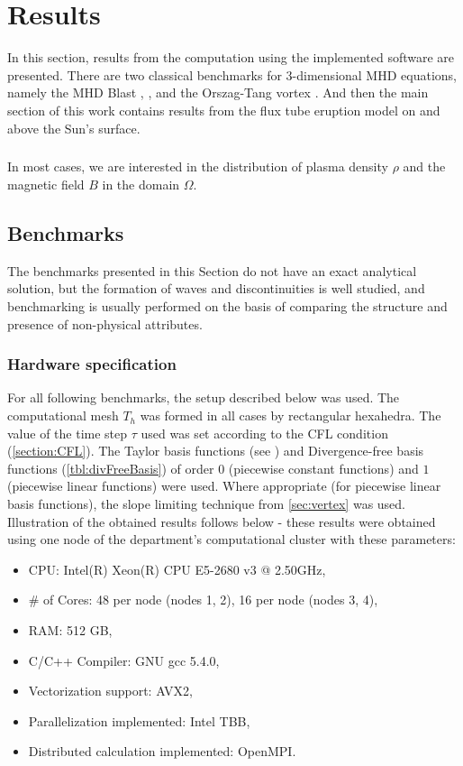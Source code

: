 \chapter{Results}
In this section, results from the computation using the implemented software are presented. There are two classical benchmarks for 3-dimensional MHD equations, namely the MHD Blast \cite{blast1}, \cite{blast2}, and the Orszag-Tang vortex \cite{vortex}. And then the main section of this work contains results from the flux tube eruption model on and above the Sun's surface.
\paragraph{}
In most cases, we are interested in the distribution of plasma density $\rho$ and the magnetic field $B$ in the domain $\Omega$.

\section{Benchmarks}
\label{sec:benchmarks}
The benchmarks presented in this Section do not have an exact analytical solution, but the formation of waves and discontinuities is well studied, and benchmarking is usually performed on the basis of comparing the structure and presence of non-physical attributes.
\subsection{Hardware specification}
For all following benchmarks, the setup described below was used. The computational mesh $T_h$ was formed in all cases by rectangular hexahedra.
The value of the time step $\tau$ used was set according to the CFL condition (\cref{section:CFL}).
The Taylor basis functions (see \cite{KuzminVertex}) and Divergence-free basis functions (\cref{tbl:divFreeBasis}) of order $0$ (piecewise constant functions) and $1$ (piecewise linear functions) were used.
Where appropriate (for piecewise linear basis functions), the slope limiting technique from \cref{sec:vertex} was used.
Illustration of the obtained results follows below - these results were obtained using one node of the department's computational cluster with these parameters:
\begin{itemize}
    \item CPU: Intel(R) Xeon(R) CPU E5-2680 v3 @ 2.50GHz,
    \item \# of Cores: 48 per node (nodes 1, 2), 16 per node (nodes 3, 4),
    \item RAM: 512 GB,
    \item C/C++ Compiler: GNU gcc 5.4.0,
		\item Vectorization support: AVX2,
    \item Parallelization implemented: Intel TBB,
    \item Distributed calculation implemented: OpenMPI.
\end{itemize}

